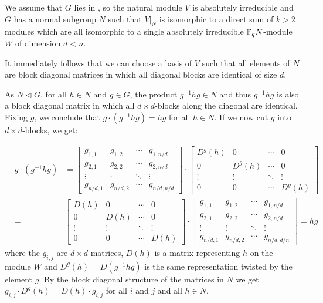 We assume that $G$ lies in , so the natural module $V$ is
absolutely irreducible and $G$ has a normal subgroup $N$ such that
$V|_N$ is isomorphic to a direct sum of $k>2$ modules which are all
isomorphic to a single absolutely irreducible $\mathbb{F}_q N$-module $W$
of dimension $d < n$.

It immediately follows that we can choose a basis of $V$ such that all
elements of $N$ are block diagonal matrices in which all diagonal blocks
are identical of size $d$.

As $N \triangleleft G$, for all $h \in N$ and $g \in G$,
 the product $g^{-1}hg \in N$ and thus $g^{-1} h g$ is also 
a block diagonal matrix in which all $d \times d$-blocks along the diagonal
are identical. Fixing $g$, we conclude that $g\cdot (g^{-1}hg) = hg$ for all
$h \in N$. If we now cut $g$ into $d \times d$-blocks, we get:

\begin{eqnarray*}
   &g \cdot (g^{-1}hg) & 
 = \left[ \begin{array}{c|c|c|c}
      g_{1,1} & g_{1,2} & \cdots & g_{1,n/d} \\ \hline
      g_{2,1} & g_{2,2} & \cdots & g_{2,n/d} \\ \hline
      \vdots  & \vdots  & \ddots & \vdots    \\ \hline
      g_{n/d,1}&g_{n/d,2}& \cdots& g_{n/d,n/d} \end{array} \right]
\cdot \left[ \begin{array}{c|c|c|c}
      D^g(h) & 0   & \cdots &      0    \\ \hline
         0   &D^g(h)&\cdots &      0    \\ \hline
      \vdots  & \vdots  & \ddots & \vdots    \\ \hline
         0    &    0    & \cdots& D^g(h) \end{array} \right] \\
 &=& \left[ \begin{array}{c|c|c|c}
      D(h)    & 0       & \cdots &     0    \\ \hline
         0    &D(h)     &\cdots &      0    \\ \hline
      \vdots  & \vdots  & \ddots & \vdots    \\ \hline
         0    &    0    & \cdots& D(h)   \end{array} \right]
\cdot \left[ \begin{array}{c|c|c|c}
      g_{1,1} & g_{1,2} & \cdots & g_{1,n/d} \\ \hline
      g_{2,1} & g_{2,2} & \cdots & g_{2,n/d} \\ \hline
      \vdots  & \vdots  & \ddots & \vdots    \\ \hline
      g_{n/d,1}&g_{n/d,2}& \cdots& g_{n/d,d/n} \end{array} \right]
 = hg
\end{eqnarray*}
where the $g_{i,j}$ are $d \times d$-matrices, $D(h)$ is a matrix
representing $h$ on the module $W$ and $D^g(h) = D(g^{-1}hg)$ is the
same representation twisted by the element $g$. By the block diagonal
structure of the matrices in $N$ we get 
$g_{i,j} \cdot D^g(h) = D(h) \cdot g_{i,j}$ for all $i$ and $j$ and 
all $h \in N$.

